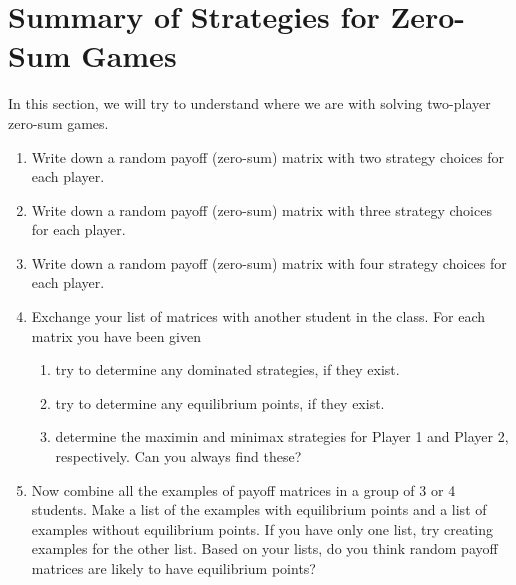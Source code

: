 

\section{Summary of Strategies for Zero-Sum Games}



\vspace{.1in}
In this section, we will try to understand where we are with solving two-player zero-sum games. %

\begin{enumerate}
\item Write down a random payoff (zero-sum) matrix with two strategy choices for each player.
\item Write down a random payoff (zero-sum) matrix with three strategy choices for each player.
\item Write down a random payoff (zero-sum) matrix with four strategy choices for each player.
\item Exchange your list of matrices with another student in the class. For each matrix you have been given


\begin{enumerate}
\item try to determine any dominated strategies, if they exist.
\item try to determine any equilibrium points, if they exist.
\item determine the maximin and minimax strategies for Player 1 and Player 2, respectively. Can you always find these?
 
\end{enumerate}

\item Now combine all the examples of payoff matrices in a group of 3 or 4 students. Make a list of the examples with equilibrium points and a list of examples without equilibrium points. If you have only one list, try creating examples for the other list. Based on your lists, do you think random payoff matrices are likely to have equilibrium points? 

\vspace{.1in}

\end{enumerate}

